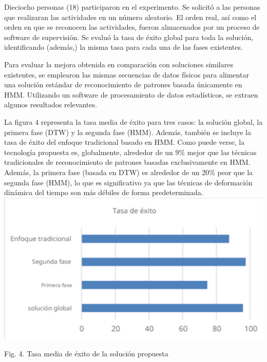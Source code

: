 \documentclass[10pt]{article}
\begin{document}
Dieciocho personas (18) participaron en el experimento. Se solicitó a las personas que realizaran las actividades en un número aleatorio. El orden real, así como el orden en que se reconocen las actividades, fueron almacenados por un proceso de software de supervisión. Se evaluó la tasa de éxito global para toda la solución, identificando (además,) la misma tasa para cada una de las fases existentes.
\newline

Para evaluar la mejora obtenida en comparación con soluciones similares existentes, se emplearon las mismas secuencias de datos físicos para alimentar una solución estándar de reconocimiento de patrones basada únicamente en HMM. Utilizando un software de procesamiento de datos estadísticos, se extraen algunos resultados relevantes.
\newline

La figura 4 representa la tasa media de éxito para tres casos: la solución global, la primera fase (DTW) y la segunda fase (HMM). Además, también se incluye la tasa de éxito del enfoque tradicional basado en HMM. Como puede verse, la tecnología propuesta es, globalmente, alrededor de un 9\% mejor que las técnicas tradicionales de reconocimiento de patrones basadas exclusivamente en HMM. Además, la primera fase (basada en DTW) es alrededor de un 20\% peor que la segunda fase (HMM), lo que es significativo ya que las técnicas de deformación dinámica del tiempo son más débiles de forma predeterminada.\\


\includegraphics[max width=\textwidth]{2022_09_15_69d89c46b49bb93649d1g-09}

Fig. 4. Tasa media de éxito de la solución propuesta
\end{document}
